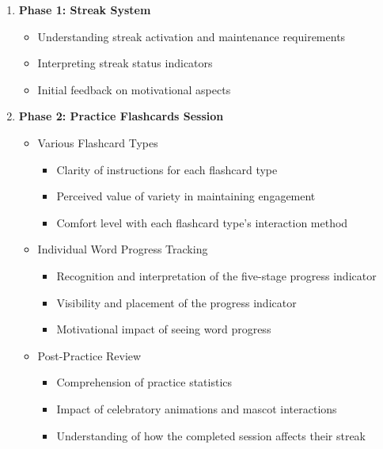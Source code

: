 \begin{enumerate}
    \item \textbf{Phase 1: Streak System}
    \begin{itemize}
        \item Understanding streak activation and maintenance requirements
        \item Interpreting streak status indicators
        \item Initial feedback on motivational aspects
    \end{itemize}
    
    \item \textbf{Phase 2: Practice Flashcards Session}
    \begin{itemize}
        \item {Various Flashcard Types}
        \begin{itemize}
            \item Clarity of instructions for each flashcard type 
            \item Perceived value of variety in maintaining engagement
            \item Comfort level with each flashcard type's interaction method
        \end{itemize}

        \item {Individual Word Progress Tracking}
        \begin{itemize}
            \item Recognition and interpretation of the five-stage progress indicator
            \item Visibility and placement of the progress indicator
            \item Motivational impact of seeing word progress
        \end{itemize}

        \item {Post-Practice Review}
        \begin{itemize}
            \item Comprehension of practice statistics
            \item Impact of celebratory animations and mascot interactions
            \item Understanding of how the completed session affects their streak
        \end{itemize}
    \end{itemize}
\end{enumerate}


